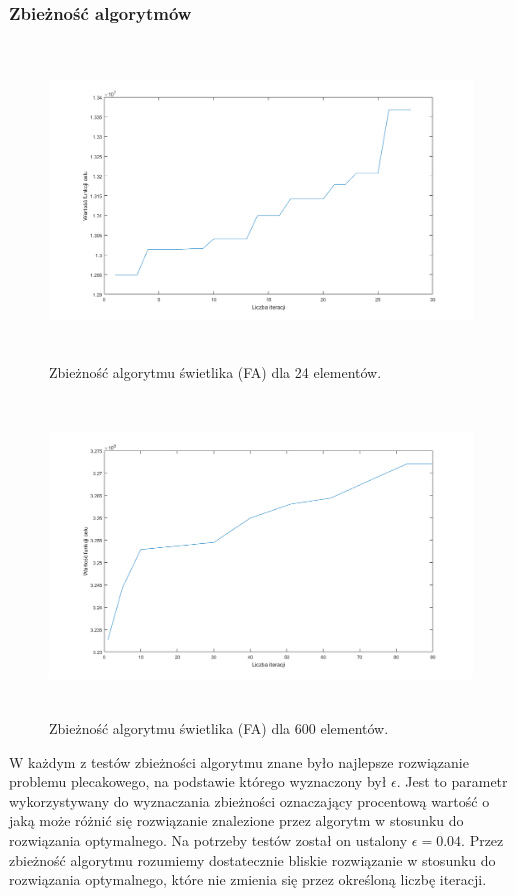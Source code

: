 \documentclass[11pt,a4paper,twoside]{article}
\begin{document}
\subsubsection{Zbieżność algorytmów}
\begin{figure}[ht]
\centering
\includegraphics[height=8.4cm, width=15.7cm]{zbieznoscFA24}
\caption{Zbieżność algorytmu świetlika (FA) dla 24 elementów.}
\label{zbieznoscFA24}
\end{figure}

\begin{figure}[ht]
\centering
\includegraphics[height=8.4cm, width=15.7cm]{zbieznoscFA600}
\caption{Zbieżność algorytmu świetlika (FA) dla 600 elementów.}
\label{zbieznoscFA600}
\end{figure}

W każdym z testów zbieżności algorytmu znane było najlepsze rozwiązanie problemu plecakowego, na podstawie którego wyznaczony był $\epsilon$. Jest to parametr wykorzystywany do wyznaczania zbieżności oznaczający procentową wartość o jaką może różnić się rozwiązanie znalezione przez algorytm w stosunku do rozwiązania optymalnego. Na potrzeby testów został on ustalony $\epsilon = 0.04$. Przez zbieżność algorytmu rozumiemy dostatecznie bliskie rozwiązanie w stosunku do rozwiązania optymalnego, które nie zmienia się przez określoną liczbę iteracji.
\end{document}
